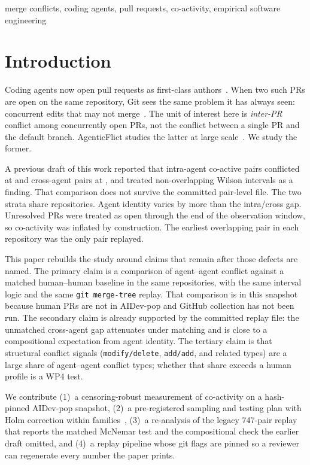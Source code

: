 \documentclass[10pt,conference]{IEEEtran}
\begin{document}
\begin{IEEEkeywords}
merge conflicts, coding agents, pull requests, co-activity, empirical software engineering
\end{IEEEkeywords}

\section{Introduction}
\label{sec:intro}

Coding agents now open pull requests as first-class authors~\cite{li2025aidev,li2026aidevpop}. When two such PRs are open on the same repository, Git sees the same problem it has always seen: concurrent edits that may not merge~\cite{brun2013crystal,sarma2012palantir}. The unit of interest here is \emph{inter-PR} conflict among concurrently open PRs, not the conflict between a single PR and the default branch. AgenticFlict studies the latter at large scale~\cite{ogenrwot2026agenticflict}. We study the former.

A previous draft of this work reported that intra-agent co-active pairs conflicted at \LegacyIntraRate{} and cross-agent pairs at \LegacyCrossRate, and treated non-overlapping Wilson intervals as a finding. That comparison does not survive the committed pair-level file. The two strata share repositories. Agent identity varies by more than the intra/cross gap. Unresolved PRs were treated as open through the end of the observation window, so co-activity was inflated by construction. The earliest overlapping pair in each repository was the only pair replayed.

This paper rebuilds the study around claims that remain after those defects are named. The primary claim is a comparison of agent--agent conflict against a matched human--human baseline in the same repositories, with the same interval logic and the same \texttt{git merge-tree} replay. That comparison is \WPFourStatus{} in this snapshot because human PRs are not in AIDev-pop and GitHub collection has not been run. The secondary claim is already supported by the committed replay file: the unmatched cross-agent gap attenuates under matching and is close to a compositional expectation from agent identity. The tertiary claim is that structural conflict signals (\texttt{modify/delete}, \texttt{add/add}, and related types) are a large share of agent--agent conflict types; whether that share exceeds a human profile is a WP4 test.

We contribute (1)~a censoring-robust measurement of co-activity on a hash-pinned AIDev-pop snapshot, (2)~a pre-registered sampling and testing plan with Holm correction within families~\cite{holm1979}, (3)~a re-analysis of the legacy 747-pair replay that reports the matched McNemar test and the compositional check the earlier draft omitted, and (4)~a replay pipeline whose git flags are pinned so a reviewer can regenerate every number the paper prints.
\end{document}
